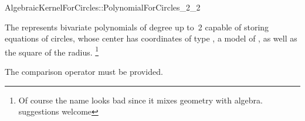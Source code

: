 \begin{ccRefConcept}{AlgebraicKernelForCircles::PolynomialForCircles_2_2}

\ccDefinition

The  represents
bivariate polynomials of degree up to~2 capable of storing equations
of circles, whose center has coordinates of type , a model of
, as well as the square of the radius.
\footnote{Of course the name looks bad since it mixes geometry with algebra. 
suggestions welcome}

\ccCreation
{}





\ccOperations

The comparison operator \ccc{==} must be provided. 


\ccHasModels


\ccSeeAlso


\end{ccRefConcept}

